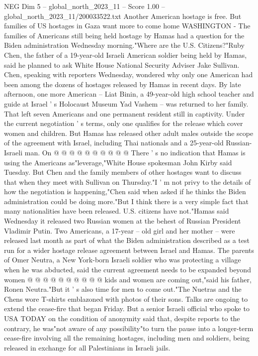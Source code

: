\begin{textsample}{NEG Dim 5 – global\_north\_2023\_11 – Score 1.00 – global\_north\_2023\_11/200033522.txt}  \label{ex:f5_neg_032}
Another American hostage is free.
But families of US hostages in Gaza want more to come home WASHINGTON - The families of Americans still being held hostage by Hamas had a question for the Biden administration Wednesday morning."Where are the U.S.
Citizens?"Ruby Chen, the father of a 19-year-old Israeli American soldier being held by Hamas, said he planned to ask White House National Security Adviser Jake Sullivan.
Chen, speaking with reporters Wednesday, wondered why only one American had been among the dozens of hostages released by Hamas in recent days.
By late afternoon, one more American -- Liat Binin, a 49-year-old high school teacher and guide at Israel ' s Holocaust Museum Yad Vashem -- was returned to her family.
That left seven Americans and one permanent resident still in captivity.
Under the current negotiation ' s terms, only one qualifies for the release which cover women and children.
But Hamas has released other adult males outside the scope of the agreement with Israel, including Thai nationals and a 25-year-old Russian-Israeli man.
On @ @ @ @ @ @ @ @ @ @ There ' s no indication that Hamas is using the Americans as"leverage,"White House spokesman John Kirby said Tuesday.
But Chen and the family members of other hostages want to discuss that when they meet with Sullivan on Thursday."I ' m not privy to the details of how the negotiation is happening,"Chen said when asked if he thinks the Biden administration could be doing more."But I think there is a very simple fact that many nationalities have been released.
U.S. citizens have not."Hamas said Wednesday it released two Russian women at the behest of Russian President Vladimir Putin.
Two Americans, a 17-year -- old girl and her mother -- were released last month as part of what the Biden administration described as a test run for a wider hostage release agreement between Israel and Hamas.
The parents of Omer Neutra, a New York-born Israeli soldier who was protecting a village when he was abducted, said the current agreement needs to be expanded beyond women @ @ @ @ @ @ @ @ @ @ kids and women are coming out,"said his father, Ronen Neutra."But it ' s also time for men to come out."The Nuetras and the Chens wore T-shirts emblazoned with photos of their sons.
Talks are ongoing to extend the cease-fire that began Friday.
But a senior Israeli official who spoke to USA TODAY on the condition of anonymity said that, despite reports to the contrary, he was"not aware of any possibility"to turn the pause into a longer-term cease-fire involving all the remaining hostages, including men and soldiers, being released in exchange for all Palestinians in Israeli jails.

\end{textsample}
